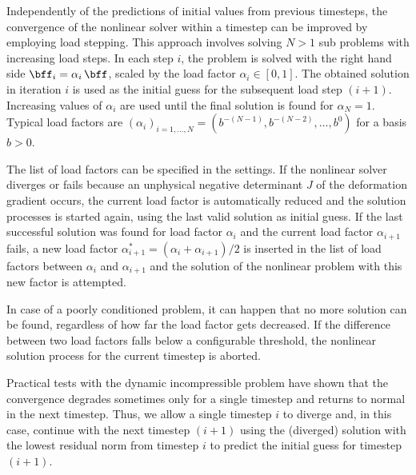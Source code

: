 Independently of the predictions of initial values from previous timesteps, the convergence of the nonlinear solver within a timestep can be  improved by employing load stepping. This approach involves solving $N>1$ sub problems with increasing load steps. In each step $i$, the problem is solved with the right hand side $\bff_i = \alpha_i\,\bff$, scaled by the load factor $\alpha_i \in [0,1]$. The obtained solution in iteration $i$ is used as the initial guess for the subsequent load step $(i+1)$. Increasing values of $\alpha_i$ are used until the final solution is found for $\alpha_N=1$. Typical load factors are $(\alpha_i)_{i=1,\dots,N} = (b^{-(N-1)}, b^{-(N-2)}, \dots, b^{0})$ for a basis $b>0$.

The list of load factors can be specified in the settings. If the nonlinear solver diverges or fails because an unphysical negative determinant $J$ of the deformation gradient occurs, the current load factor is automatically reduced and the solution processes is started again, using the last valid solution as initial guess. If the last successful solution was found for load factor $\alpha_i$ and the current load factor $\alpha_{i+1}$ fails, a new load factor $\alpha^\ast_{i+1} = (\alpha_i + \alpha_{i+1})/2$ is inserted in the list of load factors between $\alpha_i$ and $\alpha_{i+1}$ and the solution of the nonlinear problem with this new factor is attempted. 

In case of a poorly conditioned problem, it can happen that no more solution can be found, regardless of how far the load factor gets decreased. If the difference between two load factors falls below a configurable threshold, the nonlinear solution process for the current timestep is aborted.

Practical tests with the dynamic incompressible problem have shown that the convergence degrades sometimes only for a single timestep and returns to normal in the next timestep. Thus, we allow a single timestep $i$ to diverge and, in this case, continue with the next timestep $(i+1)$ using the (diverged) solution with the lowest residual norm from timestep $i$ to predict the initial guess for timestep $(i+1)$.

